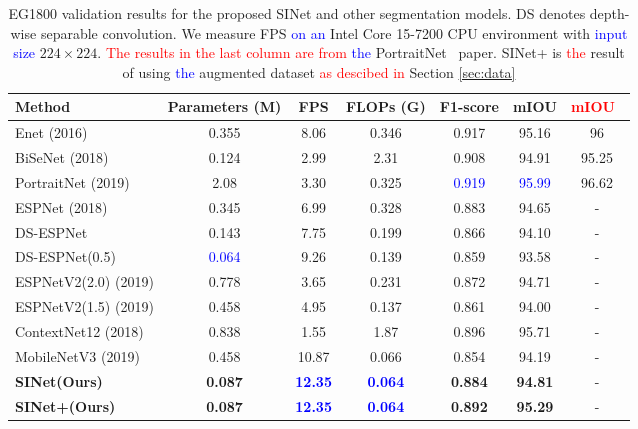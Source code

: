 \documentclass[10pt,twocolumn,letterpaper]{article}
\newcommand\Lars[1]{\textcolor{blue}{#1}}
\newcommand\nj[1]{\textcolor{red}{#1}}
\newcommand\Lars[1]{#1}
\newcommand\nj[1]{#1}
\begin{document}
\begin{table*}[t]
\small
  \begin{center}
\begin{tabular*}{0.99\textwidth}{@{\extracolsep{\fill}}| l |  cccccc|}
\hline
    Method & Parameters (M) & FPS & FLOPs (G)   & F1-score& mIOU  & \nj{mIOU}~\cite{zhang2019portraitnet} \\
    \hline
    \hline
    Enet (2016) \cite{paszke2016enet} & 0.355 & 8.06     & 0.346 &    0.917   & 95.16 & 96 \\
    BiSeNet (2018) \cite{yu2018bisenet} & 0.124 &  2.99     & 2.31  &  0.908   & 94.91 & 95.25 \\
    PortraitNet (2019)\cite{zhang2019portraitnet} & 2.08 & 3.30      & 0.325 & \textcolor{blue}{ 0.919 }    & \textcolor{blue}{95.99} & 96.62 \\
    ESPNet (2018)\cite{mehta2018espnet} & 0.345 &  6.99     & 0.328 &   0.883    & 94.65 & - \\
    DS-ESPNet  & 0.143  &    7.75      & 0.199 & 0.866    & 94.10  & - \\
    DS-ESPNet(0.5)  & \textcolor{blue}{0.064} &  9.26     & 0.139 &  0.859     & 93.58 & - \\
    ESPNetV2(2.0) (2019)\cite{mehta2018espnetv2}  & 0.778 &  3.65     & 0.231 &   0.872    & 94.71  & - \\
     ESPNetV2(1.5) (2019)\cite{mehta2018espnetv2} & 0.458  &   4.95    & 0.137 &    0.861   & 94.00 & - \\
    ContextNet12 (2018)\cite{poudel2018contextnet} & 0.838  &  1.55     & 1.87  &   0.896    & 95.71 & - \\

    MobileNetV3 (2019)\cite{howard2019searching} &   0.458     & 10.87      & 0.066 &  0.854     & 94.19  & - \\
    \textbf{SINet(Ours)}  & \textbf{0.087}  &   \textcolor{blue}{\textbf{12.35 }}   & \textcolor{blue}{\textbf{0.064}} &  \textbf{0.884 }    & \textbf{94.81}  & - \\
    \textbf{SINet+(Ours)}  & \textbf{0.087} &  \textcolor{blue}{ \textbf{12.35  }}  &\textcolor{blue}{ \textbf{0.064}} &  \textbf{0.892 }    & \textbf{95.29}  &  -\\
    
    \hline
    \end{tabular*}\end{center}
     \caption{EG1800 validation results for the proposed SINet and other segmentation models. DS denotes depth-wise separable convolution. We measure FPS \Lars{on an} Intel Core 15-7200 CPU environment with \Lars{input size} $224 \times 224$. \nj{The results in the last column are from} \Lars{the} PortraitNet~\cite{zhang2019portraitnet} paper. SINet+ is \nj{the} result of using \Lars{the} augmented dataset \nj{as descibed in} Section \ref{sec:data}}
  \label{tab:exp}\end{table*}
\end{document}
